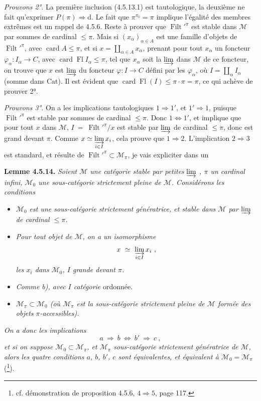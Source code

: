 \documentclass[11pt]{article}
\newcommand{\printedpage}[1]{\marginpar{\footnotesize p.~#1}}
\newcommand{\msp}[1]{\marginpar{\footnotesize [#1]}}
\newcommand{\Filt}{\operatorname{Filt}}
\newcommand{\card}{\operatorname{card}}
\newcommand{\Fl}{\operatorname{Fl}}
\begin{document}
\msp{page 132}
\textit{Prouvons 2°.} La première inclusion (4.5.13.1) est tautologique, la deuxième ne fait qu'exprimer $P(\pi) \Longrightarrow \mathrm{d}$. Le fait que $\pi^{\pi_0} = \pi$ implique l'égalité des membres extrêmes est un rappel de 4.5.6. Reste à prouver que $\Filt'^{\pi}$ est stable dans $\mathcal{M}$ par sommes de cardinal $\leqslant \pi$. Mais si $(x_{\alpha})_{\alpha\in A}$ est une famille d'objets de $\Filt'^{\pi}$, avec $\card A \leqslant \pi$, et si $x = \coprod_{\alpha\in A} x_{\alpha}$, prenant pour tout $x_{\alpha}$ un foncteur $\varphi_{\alpha} : I_{\alpha} \longrightarrow C$, avec $\card \Fl I_{\alpha} \leqslant \pi$, tel que $x_{\alpha}$ soit la $\varinjlim$ dans $\mathcal{M}$ de ce foncteur, on trouve que $x$ est $\varinjlim$ du foncteur $\varphi : I \longrightarrow C$ défini par les $\varphi_{\alpha}$, où $I = \coprod_{\alpha} I_{\alpha}$ (somme dans Cat). Il est évident que $\card \Fl(I) \leqslant \pi\cdot\pi = \pi$, ce qui achève de prouver 2°.

\textit{Prouvons 3°.} On a les implications tautologiques $1 \Longrightarrow 1'$, et $1' \Longrightarrow 1$, puisque $\Filt'^{\pi}$ est stable par sommes de cardinal $\leqslant \pi$. Donc $1 \Longleftrightarrow 1'$, et implique que pour tout $x$ dans $\mathcal{M}$,
\msp{page 133}
$I \ = \ \Filt'^{\pi}/x$ est stable par $\varinjlim$ de cardinal $\leqslant \pi$, donc est grand devant $\pi$. Comme $x \simeq \varinjlim\limits_{i\in I} x_i$, cela prouve que $1 \Longrightarrow 2$. L'implication $2 \Longrightarrow 3$ est standard, et résulte de $\Filt'^{\pi} \subset \mathcal{M}_{\pi}$, je vais expliciter dans un

\textbf{Lemme 4.5.14.} \textit{Soient $\mathcal{M}$ une catégorie stable par petites} $\varinjlim$ \textit{, $\pi$ un cardinal infini, $\mathcal{M}_0$ une sous-catégorie strictement pleine de $\mathcal{M}$. Considérons les conditions}
\begin{itemize}
\item[\textit{a)}] \textit{$\mathcal{M}_0$ est une sous-catégorie strictement génératrice, et stable dans $\mathcal{M}$ par} $\varinjlim$ \textit{de cardinal $\leqslant \pi$.}
\item[\textit{b)}] \textit{Pour tout objet de $\mathcal{M}$, on a un isomorphisme}
\[ x \ \simeq \ \varinjlim_{i\in I} x_i \ , \]
\textit{les $x_i$ dans $\mathcal{M}_0$, $I$ grande devant $\pi$.}

\printedpage{42}
\item[\textit{b$'$)}] \textit{Comme b), avec $I$ catégorie} ordonnée.
\item[\textit{c)}] \textit{$\mathcal{M}_{\pi} \subset \mathcal{M}_0$ (où $\mathcal{M}_{\pi}$ est la sous-catégorie strictement pleine de $\mathcal{M}$ formée des objets $\pi$-accessibles).}
\end{itemize}
\textit{On a donc les implications}
\[ a \ \Longrightarrow \ b \ \Longleftrightarrow \ b' \ \Longrightarrow \ c \ , \]
\textit{et si on suppose $\mathcal{M}_0 \subset \mathcal{M}_{\pi}$, et $\mathcal{M}_{\pi}$ sous-catégorie strictement génératrice de $\mathcal{M}$, alors les quatre conditions $a$, $b$, $b'$, $c$ sont équivalentes, et équivalent à $\mathcal{M}_0 = \mathcal{M}_{\pi}$} (\footnote{cf. démonstration de proposition 4.5.6, $4 \Longrightarrow 5$, page 117.}).
\end{document}
